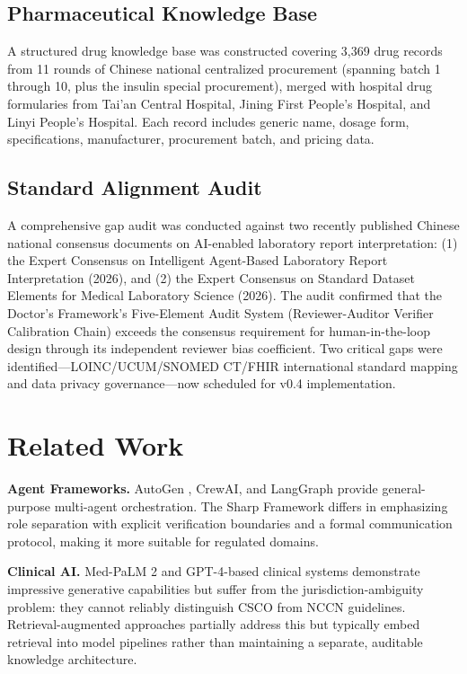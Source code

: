 \documentclass[11pt]{article}
\begin{document}
\subsection{Pharmaceutical Knowledge Base}

A structured drug knowledge base was constructed covering 3,369 drug
records from 11 rounds of Chinese national centralized procurement
(spanning batch 1 through 10, plus the insulin special procurement),
merged with hospital drug formularies from Tai'an Central Hospital,
Jining First People's Hospital, and Linyi People's Hospital.
Each record includes generic name, dosage form, specifications,
manufacturer, procurement batch, and pricing data.

\subsection{Standard Alignment Audit}

A comprehensive gap audit was conducted against two recently published
Chinese national consensus documents on AI-enabled laboratory report
interpretation: (1) the Expert Consensus on Intelligent Agent-Based
Laboratory Report Interpretation (2026), and (2) the Expert Consensus on
Standard Dataset Elements for Medical Laboratory Science (2026). The
audit confirmed that the Doctor's Framework's Five-Element Audit System
(Reviewer-Auditor Verifier Calibration Chain) exceeds the consensus
requirement for human-in-the-loop design through its independent reviewer
bias coefficient. Two critical gaps were identified---LOINC/UCUM/SNOMED
CT/FHIR international standard mapping and data privacy governance---now
scheduled for v0.4 implementation.

\section{Related Work}

\textbf{Agent Frameworks.} AutoGen \cite{wu2023autogen}, CrewAI, and 
LangGraph provide general-purpose multi-agent orchestration. The Sharp 
Framework differs in emphasizing role separation with explicit 
verification boundaries and a formal communication protocol, making it 
more suitable for regulated domains.

\textbf{Clinical AI.} Med-PaLM 2 \cite{singhal2023towards} and GPT-4-based 
clinical systems demonstrate impressive generative capabilities but suffer 
from the jurisdiction-ambiguity problem: they cannot reliably distinguish 
CSCO from NCCN guidelines. Retrieval-augmented approaches \cite{zhu2024rag} 
partially address this but typically embed retrieval into model pipelines 
rather than maintaining a separate, auditable knowledge architecture.
\end{document}
